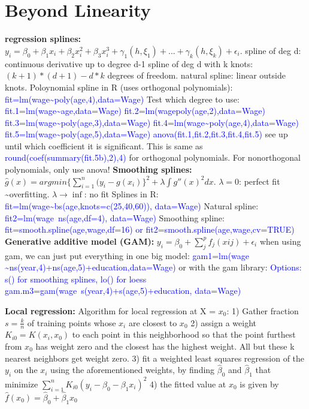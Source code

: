 \section{Beyond Linearity}
\textbf{regression splines: } 
$y_i = \beta_0 + \beta_1x_i + \beta_2x_i^2 + \beta_3x_i^3 + \gamma_1(h, \xi_1) + ... + \gamma_k(h, \xi_k) + \epsilon_i$.
spline of deg d: continuous derivative up to degree d-1
spline of deg d with k knots: $(k+1)*(d+1)-d*k$ degrees of freedom. 
natural spline: linear outside knots. 
Poloynomial spline in R (uses orthogonal polynomials): \textcolor{blue}{fit=lm(wage\textasciitilde poly(age,4),data=Wage)}
Test which degree to use: \textcolor{blue}{fit.1=lm(wage\textasciitilde age,data=Wage)
fit.2=lm(wagepoly(age,2),data=Wage)
fit.3=lm(wage\textasciitilde poly(age,3),data=Wage)
fit.4=lm(wage\textasciitilde poly(age,4),data=Wage)
fit.5=lm(wage\textasciitilde poly(age,5),data=Wage)
anova(fit.1,fit.2,fit.3,fit.4,fit.5)} see up until which coefficient it is significant. This is same as \textcolor{blue}{round(coef(summary(fit.5b),2),4)} for orthogonal polynomials. For nonorthogonal polynomials, only use anova!
\textbf{Smoothing splines: } $\hat g(x) = argmin \{\sum_{i=1}^n (y_i - g(x_i)\}^2 + \lambda \int g'' (x)^2 dx$. $\lambda = 0$: perfect fit \textasciitilde overfitting. $\lambda \rightarrow \inf$: no fit Splines in R: \textcolor{blue}{fit=lm(wage\textasciitilde bs(age,knots=c(25,40,60)), data=Wage)} Natural spline: \textcolor{blue}{fit2=lm(wage~ns(age,df=4), data=Wage)} Smoothing spline: \textcolor{blue}{fit=smooth.spline(age,wage,df=16) or fit2=smooth.spline(age,wage,cv=TRUE)}
\textbf{Generative additive model (GAM): } $y_i = \beta_0 + \sum_j^p f_j(xij) + \epsilon_i$
when using gam, we can just put everything in one big model: \textcolor{blue}{gam1=lm(wage \textasciitilde ns(year,4)+ns(age,5)+education,data=Wage)} or with the gam library: \textcolor{blue}{Options: s() for smoothing splines, lo() for loess
gam.m3=gam(wage~s(year,4)+s(age,5)+education, data=Wage)}

\textbf{Local regression: }
Algorithm for local regression at X = $x_0$: 1) Gather fraction $s = \frac{k}{n}$ of training points whose $x_i$ are closest to $x_0$ 2) assign a weight $K_{i0} = K(x_i, x_0)$ to each point in this neighborhood so that the point furthest from $x_0$ has weight zero and the closest has the highest weight. All but these k nearest neighbors get weight zero. 3) fit a weighted least squares regression of the $y_i$ on the $x_i$ using the aforementioned weights, by finding $\hat \beta_0$ and $\hat \beta_1$ that minimize $\sum_{i=1}^n K_{i0}(y_i-\beta_0-\beta_1x_i)^2$ 4) the fitted value at $x_0$ is given by $\hat f(x_0) = \hat \beta_0 + \hat \beta_1 x_0$